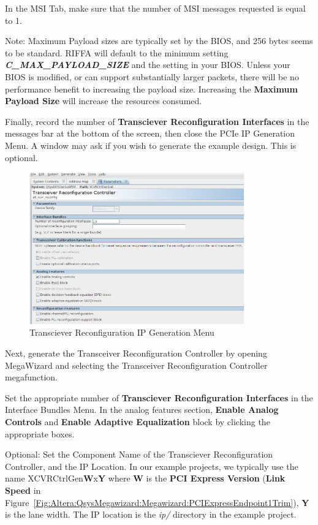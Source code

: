 \documentclass{refrep}
\newcommand{\Directory}[1]{\textit{#1}}
\newcommand{\ConfigSetting}[1]{\textbf{#1}}
\newcommand{\RIFFAParameter}[1]{\textit{\textbf{#1}}}
\begin{document}
In the MSI Tab, make sure that the number of MSI messages requested is equal to
1.

Note: Maximum Payload sizes are typically set by the BIOS, and 256 bytes seems
to be standard. RIFFA will default to the minimum setting
\RIFFAParameter{C\_MAX\_PAYLOAD\_SIZE} and the setting in your BIOS. Unless your
BIOS is modified, or can support substantially larger packets, there will be no
performance benefit to increasing the payload size. Increasing the
\ConfigSetting{Maximum Payload Size} will increase the resources consumed.

Finally, record the number of \ConfigSetting{Transciever Reconfiguration
  Interfaces} in the messages bar at the bottom of the screen, then close the
PCIe IP Generation Menu. A window may ask if you wish to generate the example
design. This is optional.
\begin{figure}[H]
  \includegraphics[width=350px,center]{XCVRMenuTrim.png}
  \caption{Transciever Reconfiguration IP Generation Menu}
  \label{Fig:Altera:QsysMegawizard:Megawizard:XCVRMenuTrim}
\end{figure}
Next, generate the Transceiver Reconfiguration Controller by opening MegaWizard
and selecting the Transceiver Reconfiguration Controller megafunction.

Set the appropriate number of \ConfigSetting{Transciever Reconfiguration
  Interfaces} in the Interface Bundles Menu. In the analog features section,
\ConfigSetting{Enable Analog Controls} and \ConfigSetting{Enable Adaptive
  Equalization} block by clicking the appropriate boxes.

Optional: Set the Component Name of the Transciever Reconfiguration Controller, and the IP
Location. In our example projects, we typically use the name
XCVRCtrlGen\ConfigSetting{W}x\ConfigSetting{Y} where \ConfigSetting{W} is the \ConfigSetting{PCI Express Version}
(\ConfigSetting{Link Speed} in
Figure~\ref{Fig:Altera:QsysMegawizard:Megawizard:PCIExpressEndpoint1Trim}), \ConfigSetting{Y}
is the lane width. The IP location is the \Directory{ip/} directory in the
example project.
\end{document}
